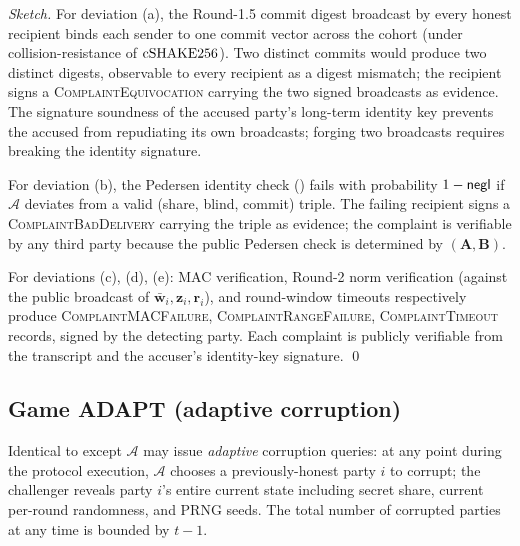 \begin{proof}[Sketch]
For deviation (a), the Round-1.5 commit digest broadcast by every
honest recipient binds each sender to one commit vector across the
cohort (under collision-resistance of $\mathrm{cSHAKE256}$). Two distinct
commits would produce two distinct digests, observable to every
recipient as a digest mismatch; the recipient signs a
\textsc{ComplaintEquivocation} carrying the two signed broadcasts as
evidence. The signature soundness of the accused party's long-term
identity key prevents the accused from repudiating its own
broadcasts; forging two broadcasts requires breaking the identity
signature.

For deviation (b), the Pedersen identity check
() fails with probability $1 - \mathsf{negl}$ if
$\mathcal{A}$ deviates from a valid (share, blind, commit) triple.
The failing recipient signs a \textsc{ComplaintBadDelivery}
carrying the triple as evidence; the complaint is verifiable by any
third party because the public Pedersen check is determined by
$(\mathbf{A}, \mathbf{B})$.

For deviations (c), (d), (e): MAC verification, Round-2 norm
verification (against the public broadcast of $\bar{\mathbf{w}}_i,
\mathbf{z}_i, \mathbf{r}_i$), and round-window timeouts respectively
produce \textsc{ComplaintMACFailure}, \textsc{ComplaintRangeFailure},
\textsc{ComplaintTimeout} records, signed by the detecting party. Each
complaint is publicly verifiable from the transcript and the
accuser's identity-key signature. \qed
\end{proof}

\subsection{Game ADAPT (adaptive corruption)}
\label{sec:game-adapt}

\begin{game}[ADAPT]
\label{game:adapt}
Identical to  except $\mathcal{A}$ may issue
\emph{adaptive} corruption queries: at any point during the protocol
execution, $\mathcal{A}$ chooses a previously-honest party $i$ to
corrupt; the challenger reveals party $i$'s entire current state
including secret share, current per-round randomness, and PRNG
seeds. The total number of corrupted parties at any time is bounded
by $t-1$.
\end{game}

